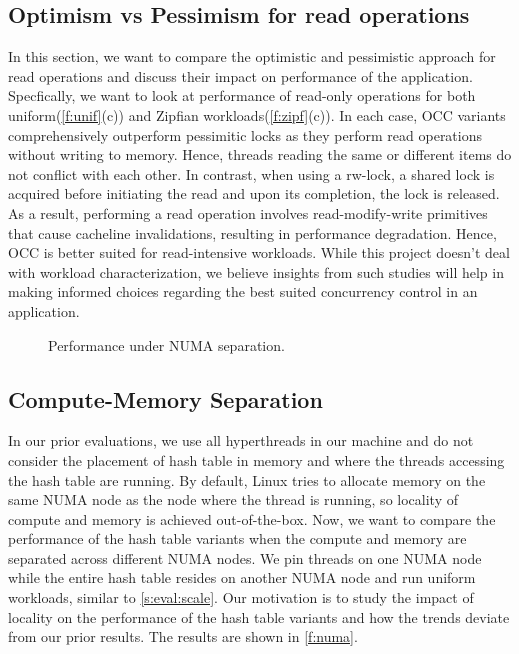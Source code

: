 \subsection{Optimism vs Pessimism for read operations}
\label{s:eval:rmw-read}
In this section, we want to compare the optimistic and pessimistic approach for
read operations and discuss their impact on performance of the application. Specfically,
we want to look at performance of read-only operations for both uniform(\autoref{f:unif}(c))
and Zipfian workloads(\autoref{f:zipf}(c)). In each case, OCC variants comprehensively
outperform pessimitic locks as they perform read operations without writing to memory.
Hence, threads reading the same or different items do not conflict with each other.
In contrast, when using a rw-lock, a shared lock is acquired before initiating the read
and upon its completion, the lock is released. As a result, performing a read operation
involves read-modify-write primitives that cause cacheline invalidations, resulting
in performance degradation. Hence, OCC is better suited for read-intensive workloads.
While this project doesn't deal with workload characterization, we believe insights
from such studies will help in making informed choices regarding the best suited
concurrency control in an application.

\begin{figure*}[t]
    \centering
    
    \caption{Performance under NUMA separation.}
    \label{f:numa}
    \vspace{-8pt}
\end{figure*}

\subsection{Compute-Memory Separation}
\label{s:eval:numa}
In our prior evaluations, we use all hyperthreads in our machine and do not consider
the placement of hash table in memory and where the threads accessing the hash table
are running. By default, Linux tries to allocate memory on the same NUMA node as the
node where the thread is running, so locality of compute and memory is achieved
out-of-the-box. Now, we want to compare the performance of the hash table variants
when the compute and memory are separated across different NUMA nodes. We pin threads
on one NUMA node while the entire hash table resides on another NUMA node and run
uniform workloads, similar to \autoref{s:eval:scale}. Our motivation is to study
the impact of locality on the performance of the hash table variants and how the
trends deviate from our prior results. The results are shown in \autoref{f:numa}.

